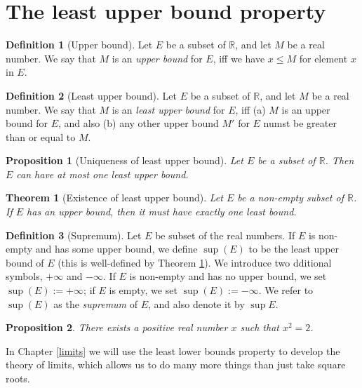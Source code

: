\documentclass[
]{book}
\newtheorem{theorem}{Theorem}[chapter]
\newtheorem{proposition}{Proposition}[chapter]
\theoremstyle{definition}
\newtheorem{definition}{Definition}[chapter]
\theoremstyle{definition}
\theoremstyle{definition}
\theoremstyle{definition}
\theoremstyle{remark}
\begin{document}
\section{The least upper bound property}\label{the-least-upper-bound-property}

\begin{definition}[Upper bound]
Let \(E\) be a subset of \(\mathbb{R}\), and let \(M\) be a real number. We say that \(M\) is an \emph{upper bound} for \(E\), iff we have \(x\leq M\) for element \(x\) in \(E\).
\end{definition}

\begin{definition}[Least upper bound]
Let \(E\) be a subset of \(\mathbb{R}\), and let \(M\) be a real number. We say that \(M\) is an \emph{least upper bound} for \(E\), iff (a) \(M\) is an upper bound for \(E\), and also (b) any other upper bound \(M'\) for \(E\) numst be greater than or equal to \(M\).
\end{definition}

\begin{proposition}[Uniqueness of least upper bound]
Let \(E\) be a subset of \(\mathbb{R}\). Then \(E\) can have at most one least upper bound.
\end{proposition}

\begin{theorem}[Existence of least upper bound]
\protect\hypertarget{thm:ex}{}\label{thm:ex}Let \(E\) be a non-empty subset of \(\mathbb{R}\). If \(E\) has an upper bound, then it must have exactly one least bound.
\end{theorem}

\begin{definition}[Supremum]
Let \(E\) be subset of the real numbers. If \(E\) is non-empty and has some upper bound, we define \(\sup(E)\) to be the least upper bound of \(E\) (this is well-defined by Theorem \ref{thm:ex}). We introduce two dditional symbols, \(+\infty\) and \(-\infty\). If \(E\) is non-empty and has no upper bound, we set \(\sup(E):=+\infty\); if \(E\) is empty, we set \(\sup(E):=-\infty\). We refer to \(\sup(E)\) as the \emph{supremum} of \(E\), and also denote it by \(\sup E\).
\end{definition}

\begin{proposition}
There exists a positive real number \(x\) such that \(x^2=2\).
\end{proposition}

In Chapter \ref{limits} we will use the least lower bounds property to develop the theory of limits, which allows us to do many more things than just take square roots.
\end{document}
